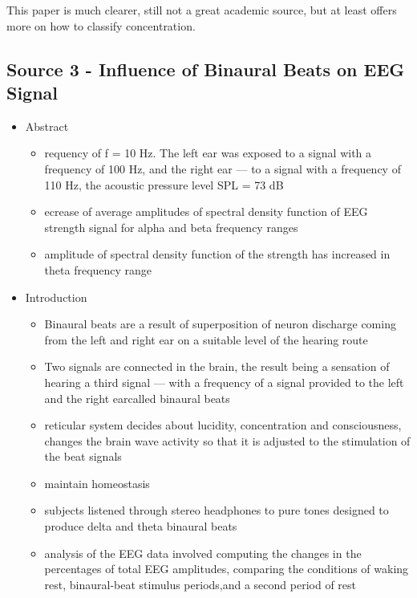 \documentclass[a4paper]{article}
\begin{document}
This paper is much clearer, still not a great academic source, but at least offers more on how to classify concentration.

\subsection*{Source 3 - Influence of Binaural Beats on EEG Signal}

\begin{itemize}
    \item Abstract
          \begin{itemize}
              \item requency of
                    f = 10 Hz. The left ear was exposed to a signal with a frequency of 100 Hz, and the right ear — to a signal with a frequency of 110 Hz, the acoustic pressure level SPL = 73 dB
              \item ecrease of average amplitudes of spectral density function of EEG strength signal for alpha and beta frequency ranges
              \item amplitude of spectral density function of the strength has increased in theta frequency range
          \end{itemize}
    \item Introduction
          \begin{itemize}
              \item Binaural beats are a result of superposition of neuron discharge coming from the left and right ear on a suitable level of the hearing route
              \item Two signals are connected in the brain, the result being
                    a sensation of hearing a third signal — with a frequency of a signal provided to the left and the right earcalled binaural beats
              \item reticular system decides about lucidity, concentration and consciousness, changes the brain wave activity so that it is adjusted to the stimulation of the beat signals
              \item maintain homeostasis
              \item subjects listened through stereo headphones to pure tones designed to produce delta and theta binaural beats
              \item analysis of the EEG data involved computing the changes in the percentages of total EEG amplitudes, comparing the conditions of waking rest, binaural-beat stimulus periods,and a second period of rest

\end{itemize}
\end{itemize}
\end{document}
